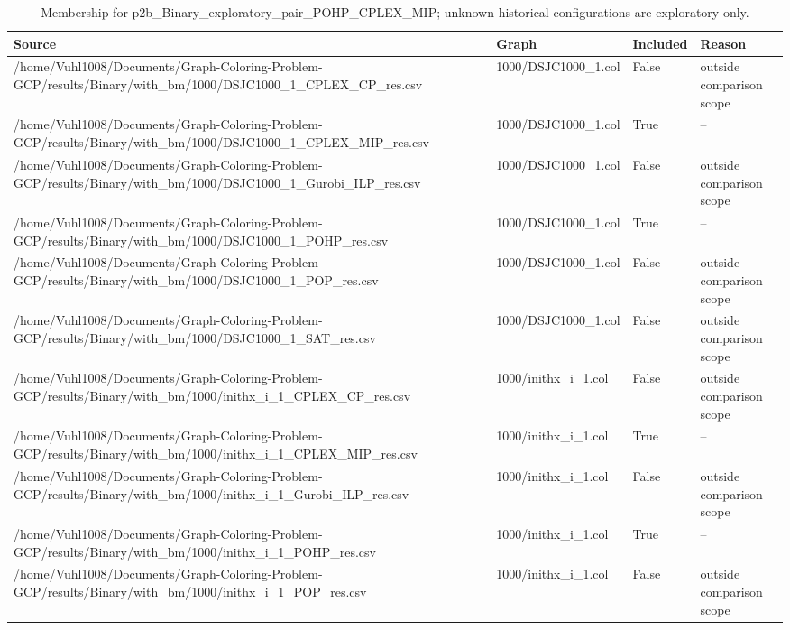 \begin{table}[htbp]
\centering
\caption{Membership for p2b\_Binary\_exploratory\_pair\_POHP\_CPLEX\_MIP; unknown historical configurations are exploratory only.}
\label{tab:p2b-Binary-exploratory-pair-POHP-CPLEX-MIP-membership}
\begin{tabular}{llll}
\hline
Source & Graph & Included & Reason \\
\hline
/home/Vuhl1008/Documents/Graph-Coloring-Problem-GCP/results/Binary/with\_bm/1000/DSJC1000\_1\_CPLEX\_CP\_res.csv & 1000/DSJC1000\_1.col & False & outside comparison scope \\
/home/Vuhl1008/Documents/Graph-Coloring-Problem-GCP/results/Binary/with\_bm/1000/DSJC1000\_1\_CPLEX\_MIP\_res.csv & 1000/DSJC1000\_1.col & True & -- \\
/home/Vuhl1008/Documents/Graph-Coloring-Problem-GCP/results/Binary/with\_bm/1000/DSJC1000\_1\_Gurobi\_ILP\_res.csv & 1000/DSJC1000\_1.col & False & outside comparison scope \\
/home/Vuhl1008/Documents/Graph-Coloring-Problem-GCP/results/Binary/with\_bm/1000/DSJC1000\_1\_POHP\_res.csv & 1000/DSJC1000\_1.col & True & -- \\
/home/Vuhl1008/Documents/Graph-Coloring-Problem-GCP/results/Binary/with\_bm/1000/DSJC1000\_1\_POP\_res.csv & 1000/DSJC1000\_1.col & False & outside comparison scope \\
/home/Vuhl1008/Documents/Graph-Coloring-Problem-GCP/results/Binary/with\_bm/1000/DSJC1000\_1\_SAT\_res.csv & 1000/DSJC1000\_1.col & False & outside comparison scope \\
/home/Vuhl1008/Documents/Graph-Coloring-Problem-GCP/results/Binary/with\_bm/1000/inithx\_i\_1\_CPLEX\_CP\_res.csv & 1000/inithx\_i\_1.col & False & outside comparison scope \\
/home/Vuhl1008/Documents/Graph-Coloring-Problem-GCP/results/Binary/with\_bm/1000/inithx\_i\_1\_CPLEX\_MIP\_res.csv & 1000/inithx\_i\_1.col & True & -- \\
/home/Vuhl1008/Documents/Graph-Coloring-Problem-GCP/results/Binary/with\_bm/1000/inithx\_i\_1\_Gurobi\_ILP\_res.csv & 1000/inithx\_i\_1.col & False & outside comparison scope \\
/home/Vuhl1008/Documents/Graph-Coloring-Problem-GCP/results/Binary/with\_bm/1000/inithx\_i\_1\_POHP\_res.csv & 1000/inithx\_i\_1.col & True & -- \\
/home/Vuhl1008/Documents/Graph-Coloring-Problem-GCP/results/Binary/with\_bm/1000/inithx\_i\_1\_POP\_res.csv & 1000/inithx\_i\_1.col & False & outside comparison scope \\

\end{tabular}
\end{table}
